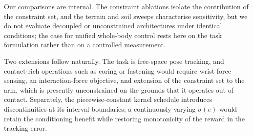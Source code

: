 Our comparisons are internal. The constraint ablations isolate the contribution of the constraint set, and the terrain and soil sweeps characterise sensitivity, but we do not evaluate decoupled or unconstrained architectures under identical conditions; the case for unified whole-body control rests here on the task formulation rather than on a controlled measurement.

Two extensions follow naturally. The task is free-space pose tracking, and contact-rich operations such as coring or fastening would require wrist force sensing, an interaction-force objective, and extension of the constraint set to the arm, which is presently unconstrained on the grounds that it operates out of contact. Separately, the piecewise-constant kernel schedule introduces discontinuities at its interval boundaries; a continuously varying $\sigma(e)$ would retain the conditioning benefit while restoring monotonicity of the reward in the tracking error.
